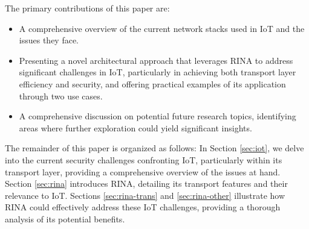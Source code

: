 \documentclass{ieeeaccess}
\begin{document}
The primary contributions of this paper are:
\begin{itemize}
	\item A comprehensive overview of the current network stacks used in IoT and the issues they face.
	\item Presenting a novel architectural approach that leverages RINA to address significant challenges in IoT, particularly in achieving both transport layer efficiency and security, and offering practical examples of its application through two use cases.
	\item A comprehensive discussion on potential future research topics, identifying areas where further exploration could yield significant insights.
\end{itemize}




The remainder of this paper is organized as follows: 
In Section \ref{sec:iot}, we delve into the current security challenges confronting IoT, particularly within its transport layer, providing a comprehensive overview of the issues at hand. Section \ref{sec:rina} introduces RINA, detailing its transport features and their relevance to IoT. Sections \ref{sec:rina-trans} and \ref{sec:rina-other} illustrate how RINA could effectively address these IoT challenges, providing a thorough analysis of its potential benefits. 
\end{document}
